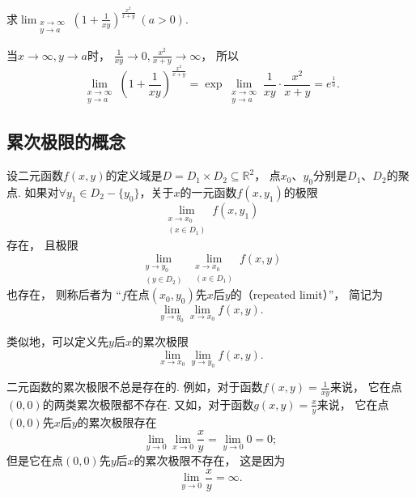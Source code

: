 \begin{example}
求\(\lim_{\substack{x\to\infty \\ y \to a}} \left( 1 + \frac1{x y} \right)^{\frac{x^2}{x+y}}\ (a>0)\).
\begin{solution}
当\(x\to\infty,y \to a\)时，
\(\frac1{xy} \to 0,
\frac{x^2}{x+y} \to \infty\)，
所以\begin{equation*}
	\lim_{\substack{x\to\infty \\ y \to a}} \left( 1 + \frac1{x y} \right)^{\frac{x^2}{x+y}}
	= \exp\lim_{\substack{x\to\infty \\ y \to a}} \frac1{x y} \cdot \frac{x^2}{x+y}
	= e^{\frac1a}.
\end{equation*}
\end{solution}
\end{example}

\subsection{累次极限的概念}
\begin{definition}
设二元函数\(f(x,y)\)的定义域是\(D = D_1 \times D_2 \subseteq \mathbb{R}^2\)，
点\(x_0\)、\(y_0\)分别是\(D_1\)、\(D_2\)的聚点.
如果对\(\forall y_1 \in D_2 - \{y_0\}\)，关于\(x\)的一元函数\(f(x,y_1)\)的极限\begin{equation*}
	\lim_{\substack{x \to x_0 \\ (x \in D_1)}} f(x,y_1)
\end{equation*}存在，
且极限\begin{equation*}
	\lim_{\substack{y \to y_0 \\ (y \in D_2)}}
	\lim_{\substack{x \to x_0 \\ (x \in D_1)}} f(x,y)
\end{equation*}也存在，
则称后者为
“\(f\)在点\((x_0,y_0)\)先\(x\)后\(y\)的（repeated limit）”，
简记为\begin{equation*}
	\lim_{y \to y_0} \lim_{x \to x_0} f(x,y).
\end{equation*}

类似地，可以定义先\(y\)后\(x\)的累次极限\begin{equation*}
	\lim_{x \to x_0} \lim_{y \to y_0} f(x,y).
\end{equation*}
\end{definition}

二元函数的累次极限不总是存在的.
例如，对于函数\(f(x,y)=\frac1{xy}\)来说，
它在点\((0,0)\)的两类累次极限都不存在.
又如，对于函数\(g(x,y)=\frac{x}{y}\)来说，
它在点\((0,0)\)先\(x\)后\(y\)的累次极限存在\begin{equation*}
	\lim_{y\to0}\lim_{x\to0}\frac{x}{y}
	=\lim_{y\to0}0
	=0;
\end{equation*}
但是它在点\((0,0)\)先\(y\)后\(x\)的累次极限不存在，
这是因为\begin{equation*}
	\lim_{y\to0}\frac{x}{y}=\infty.
\end{equation*}

